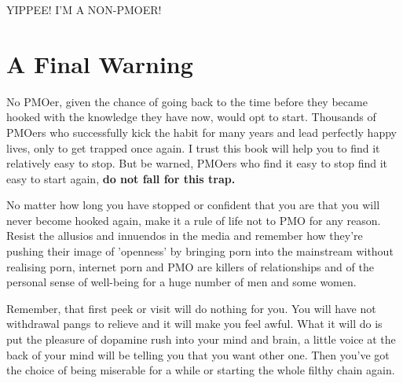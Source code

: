 \documentclass[easypeasy.tex]{subfiles}
\begin{document}
{\huge YIPPEE! I'M A NON-PMOER!}

\section{A Final Warning}

No PMOer, given the chance of going back to the time before they became hooked with the knowledge they have now, would opt to start. Thousands of PMOers who successfully kick the habit for many years and lead perfectly happy lives, only to get trapped once again. I trust this book will help you to find it relatively easy to stop. But be warned, PMOers who find it easy to stop find it easy to start again, \textbf{do not fall for this trap.}

No matter how long you have stopped or confident that you are that you will never become hooked again, make it a rule of life not to PMO for any reason. Resist the allusios and innuendos in the media and remember how they're pushing their image of 'openness' by bringing porn into the mainstream without realising porn, internet porn and PMO are killers of relationships and of the personal sense of well-being for a huge number of men and some women.

Remember, that first peek or visit will do nothing for you. You will have not withdrawal pangs to relieve and it will make you feel awful. What it will do is put the pleasure of dopamine rush into your mind and brain, a little voice at the back of your mind will be telling you that you want other one. Then you've got the choice of being miserable for a while or starting the whole filthy chain again.
\end{document}
